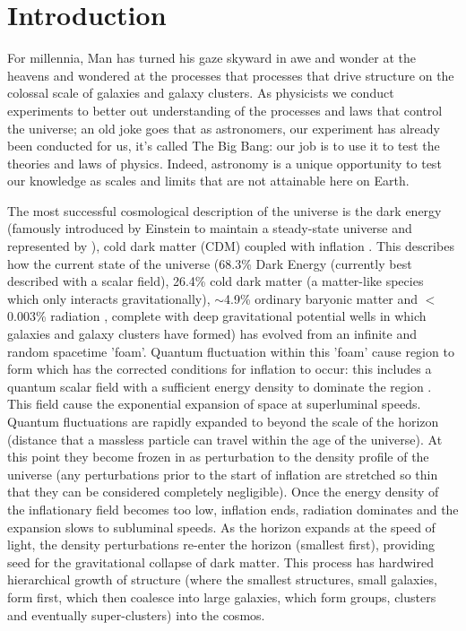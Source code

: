 \chapter{Introduction}
For millennia, Man has turned his gaze skyward in awe and wonder at the heavens and wondered at the processes that processes that drive structure on the colossal scale of galaxies and galaxy clusters. As physicists we conduct experiments to better out understanding of the processes and laws that control the universe; an old joke goes that as astronomers, our experiment has already been conducted for us, it's called The Big Bang: our job is to use it to test the theories and laws of physics. Indeed, astronomy is a unique opportunity to test our knowledge as scales and limits that are not attainable here on Earth.

The most successful cosmological description of the universe is the dark energy (famously introduced by Einstein to maintain a steady-state universe and represented by \textLambda), cold dark matter ({\textLambda}CDM) \citep{Peebles1982, Bond1982, Blumenthal1982, Blumenthal1984} coupled with inflation \citep{Guth1981}. This describes how the current state of the universe (68.3\% Dark Energy (currently best described with a scalar field), 26.4\% cold dark matter (a matter-like species which only interacts gravitationally), $\sim$4.9\% ordinary baryonic matter and $<$0.003\% radiation \citep{PlanckCollaboration2016}, complete with deep gravitational potential wells in which galaxies and galaxy clusters have formed) has evolved from an infinite and random spacetime 'foam'. Quantum fluctuation within this 'foam' cause region to form which has the corrected conditions for inflation to occur: this includes a quantum scalar field with a sufficient energy density to dominate the region \citep{Linde1982, Albrecht1982}. This field cause the exponential expansion of space at superluminal speeds. Quantum fluctuations are rapidly expanded to beyond the scale of the horizon (distance that a massless particle can travel within the age of the universe). At this point they become frozen in as perturbation to the density profile of the universe (any perturbations prior to the start of inflation are stretched so thin that they can be considered completely negligible). Once the energy density of the inflationary field becomes too low, inflation ends, radiation dominates and the expansion slows to subluminal speeds. As the horizon expands at the speed of light, the density perturbations re-enter the horizon (smallest first), providing seed for the gravitational collapse of dark matter. This process has hardwired hierarchical growth of structure (where the smallest structures, small galaxies, form first, which then coalesce into large galaxies, which form groups, clusters and eventually super-clusters) into the cosmos. 

